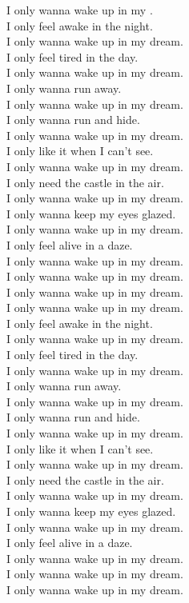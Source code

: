I only wanna wake up in my . \\
I only feel awake in the night. \\
I only wanna wake up in my dream. \\
I only feel tired in the day. \\
I only wanna wake up in my dream. \\
I only wanna run away. \\
I only wanna wake up in my dream. \\
I only wanna run and hide. \\
I only wanna wake up in my dream. \\
I only like it when I can't see. \\
I only wanna wake up in my dream. \\
I only need the castle in the air. \\
I only wanna wake up in my dream. \\
I only wanna keep my eyes glazed. \\
I only wanna wake up in my dream. \\
I only feel alive in a daze. \\
I only wanna wake up in my dream. \\
I only wanna wake up in my dream. \\
I only wanna wake up in my dream. \\

I only wanna wake up in my dream. \\
I only feel awake in the night. \\
I only wanna wake up in my dream. \\
I only feel tired in the day. \\
I only wanna wake up in my dream. \\
I only wanna run away. \\
I only wanna wake up in my dream. \\
I only wanna run and hide. \\
I only wanna wake up in my dream. \\
I only like it when I can't see. \\
I only wanna wake up in my dream. \\
I only need the castle in the air. \\
I only wanna wake up in my dream. \\
I only wanna keep my eyes glazed. \\
I only wanna wake up in my dream. \\
I only feel alive in a daze. \\
I only wanna wake up in my dream. \\
I only wanna wake up in my dream. \\
I only wanna wake up in my dream. \\

